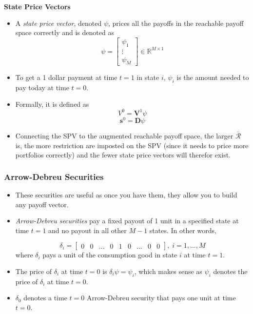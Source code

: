 \documentclass[11pt]{article}
\begin{document}
\textbf{State Price Vectors}
\begin{itemize}
    \item A \textit{state price vector}, denoted $\psi$, prices all the payoffs in the 
    reachable payoff space correctly and is denoted as 
    \[
    \psi = \begin{bmatrix}
        \psi_1 \\ 
        \vdots \\
        \psi_M
    \end{bmatrix} \in \mathbb{R}^{M \times 1}
    \]
    \item To get a 1 dollar payment at time $t=1$ in state $i$, $\psi_i$ is the amount needed
    to pay today at time $t=0$.
    \item Formally, it is defined as
    \[V^0 = \boldsymbol{V}^1 \psi\]
    \[\boldsymbol{s}^0 = \boldsymbol{D} \psi\]
    \item Connecting the SPV to the augmented reachable payoff space, the larger 
    $\bar{\mathcal{R}}$ is, the more restriction are imposted on the SPV (since it needs to 
    price more portfolios correctly) and the fewer state price vectors will therefor exist.
\end{itemize}

\subsubsection{Arrow-Debreu Securities}
\begin{itemize}
    \item These securities are useful as once you have them, they allow you to build any payoff 
    vector.
    \item \textit{Arrow-Debreu securities} pay a fixed payout of 1 unit in a specified state at
    time $t=1$ and no payout in all other $M-1$ states. In other words, 

    \[ 
    \delta_i = 
    \begin{bmatrix}
        0 & 0 & \hdots & 0 & 1 & 0 & \hdots & 0 & 0
    \end{bmatrix}, \; i = 1, \ldots, M
    \]
    where $\delta_i$ pays a unit of the consumption good in state $i$ at time $t=1$.
    \item The price of $\delta_i$ at time $t=0$ is $\delta_i \psi = \psi_i$, which makes sense 
    as $\psi_i$ denotes the price of $\delta_i$ at time $t=0$.
    \item $\delta_0$ denotes a time $t=0$ Arrow-Debreu security that pays one unit at time 
    $t=0$.
\end{itemize}
\end{document}
